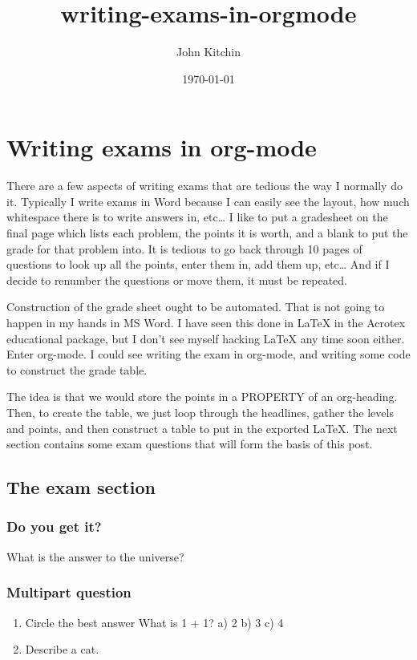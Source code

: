 \documentclass[11pt]{article}
\author{John Kitchin}
\date{\today}
\title{writing-exams-in-orgmode}
\begin{document}
\maketitle
\tableofcontents

\section{Writing exams in org-mode}
\label{sec-1}
There are a few aspects of writing exams that are tedious the way I normally do it. Typically I write exams in Word because I can easily see the layout, how much whitespace there is to write answers in, etc\ldots{} I like to put a gradesheet on the final page which lists each problem, the points it is worth, and a blank to put the grade for that problem into.  It is tedious to go back through 10 pages of questions to look up all the points, enter them in, add them up, etc\ldots{} And if I decide to renumber the questions or move them, it must be repeated.

Construction of the grade sheet ought to be automated. That is not going to happen in my hands in MS Word. I have seen this done in \LaTeX{} in the Acrotex educational package, but I don't see myself hacking \LaTeX{} any  time soon either. Enter org-mode. I could see writing the exam in org-mode, and writing some code to construct the grade table. 


The idea is that we would store the points in a PROPERTY of an org-heading. Then, to create the table, we just loop through the headlines, gather the levels and points, and then construct a table to put in the exported \LaTeX{}. The next section contains some exam questions that will form the basis of this post.

\subsection{The exam section}
\label{sec-1-1}
\subsubsection{Do you get it?}
\label{sec-1-1-1}
What is the answer to the universe?
 \vspace{2cm} 

\subsubsection{Multipart question}
\label{sec-1-1-2}
\begin{enumerate}
\item Circle the best answer
\label{sec-1-1-2-1}
What is 1 + 1?
a) 2
b) 3
c) 4

\item Describe a cat.
\label{sec-1-1-2-2}
\vspace{2cm}
\end{enumerate}
\end{document}
